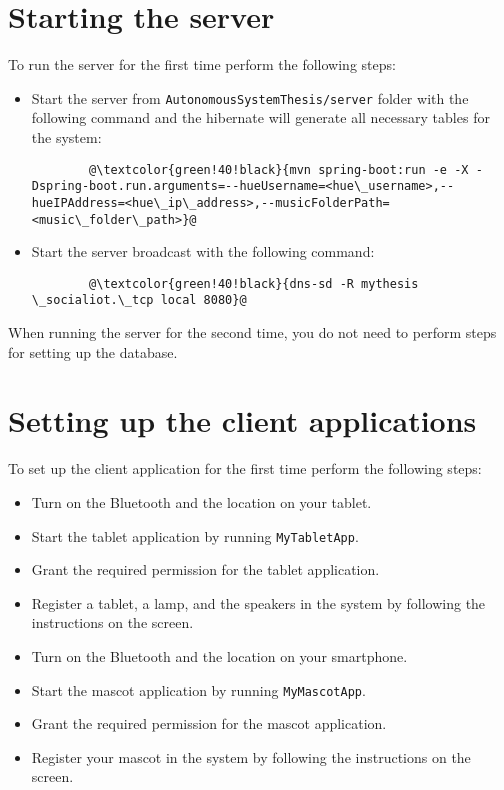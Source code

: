 \section{Starting the server}
\label{sec:starting-the-server.}
To run the server for the first time perform the following steps:
\begin{itemize}
    \item Start the server from \texttt{AutonomousSystemThesis/server} folder with the following
    command and the hibernate will generate all necessary tables for the system:
    \begin{lstlisting}
        @\textcolor{green!40!black}{mvn spring-boot:run -e -X -Dspring-boot.run.arguments=--hueUsername=<hue\_username>,--hueIPAddress=<hue\_ip\_address>,--musicFolderPath=<music\_folder\_path>}@
    \end{lstlisting}
    \item Start the server broadcast with the following command:
    \begin{lstlisting}
        @\textcolor{green!40!black}{dns-sd -R mythesis \_socialiot.\_tcp local 8080}@
    \end{lstlisting}
\end{itemize}
When running the server for the second time, you do not need to perform steps for setting
up the database.
\section{Setting up the client applications}
\label{sec:setting-up-the-client-applications.}
To set up the client application for the first time perform the following steps:
\begin{itemize}
    \item Turn on the Bluetooth and the location on your tablet.
    \item Start the tablet application by running \texttt{MyTabletApp}.
    \item Grant the required permission for the tablet application.
    \item Register a tablet, a lamp, and the speakers in the system by following the instructions on the screen.
    \item Turn on the Bluetooth and the location on your smartphone.
    \item Start the mascot application by running \texttt{MyMascotApp}.
    \item Grant the required permission for the mascot application.
    \item Register your mascot in the system by following the instructions on the screen.
\end{itemize}

